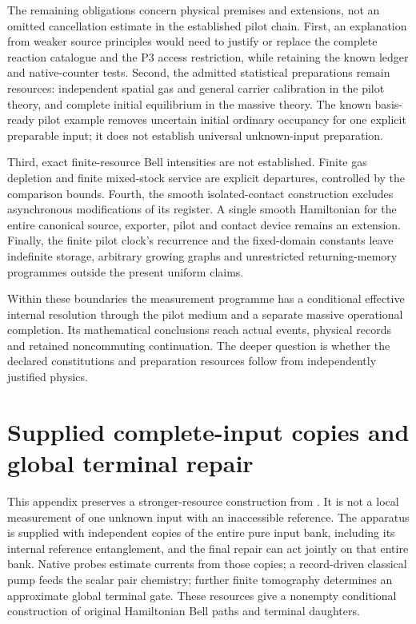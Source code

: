 \documentclass[11pt,oneside,openany]{book}
\theoremstyle{definition}
\theoremstyle{remark}\newtheorem{remark}[theorem]{Remark}
\begin{document}
The remaining obligations concern physical premises and extensions,
not an omitted cancellation estimate in the established pilot chain.
First, an explanation from weaker source principles would need to
justify or replace the complete reaction catalogue and the P3 access
restriction, while retaining the known ledger and native-counter
tests. Second, the admitted statistical preparations remain resources:
independent spatial gas and general carrier calibration in the pilot
theory, and complete initial equilibrium in the massive theory. The
known basis-ready pilot example removes uncertain initial ordinary
occupancy for one explicit preparable input; it does not establish
universal unknown-input preparation.

Third, exact finite-resource Bell intensities are not established.
Finite gas depletion and finite mixed-stock service are explicit
departures, controlled by the comparison bounds. Fourth, the smooth
isolated-contact construction excludes asynchronous modifications of
its register. A single smooth Hamiltonian for the entire canonical
source, exporter, pilot and contact device remains an extension.
Finally, the finite pilot clock's recurrence and the fixed-domain constants
leave indefinite storage, arbitrary growing graphs and unrestricted
returning-memory programmes outside the present uniform claims.

Within these boundaries the measurement programme has a conditional
effective internal resolution through the pilot medium and a separate
massive operational completion. Its mathematical conclusions reach
actual events, physical records and retained noncommuting continuation.
The deeper question is whether the declared constitutions and
preparation resources follow from independently justified physics.


\appendix

\chapter{Supplied complete-input copies and global terminal repair}
\label{copy:chapter}

This appendix preserves a stronger-resource construction from
\cite{M11}. It is not a local measurement of one unknown input with an
inaccessible reference. The apparatus is supplied with independent
copies of the entire pure input bank, including its internal reference
entanglement, and the final repair can act jointly on that entire bank.
Native probes estimate currents from those copies; a record-driven
classical pump feeds the scalar pair chemistry; further finite
tomography determines an approximate global terminal gate. These
resources give a nonempty conditional construction of original
Hamiltonian Bell paths and terminal daughters.
\end{document}
